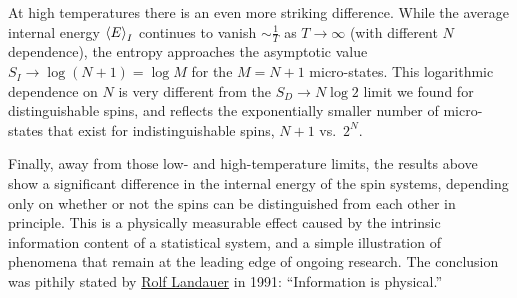 At high temperatures there is an even more striking difference.
While the average internal energy $\left\langle E \right\rangle_I$ continues to vanish $\sim$$\frac{1}{T}$ as $T \to \infty$ (with different $N$ dependence), the entropy approaches the asymptotic value $S_I \to \log\left(N + 1\right) = \log M$ for the $M = N + 1$ micro-states.
This logarithmic dependence on $N$ is very different from the $S_D \to N\log 2$ limit we found for distinguishable spins, and reflects the exponentially smaller number of micro-states that exist for indistinguishable spins, $N + 1$ vs.\ $2^N$.

Finally, away from those low- and high-temperature limits, the results above show a significant difference in the internal energy of the spin systems, depending only on whether or not the spins can be distinguished from each other in principle.
This is a physically measurable effect caused by the intrinsic information content of a statistical system, and a simple illustration of phenomena that remain at the leading edge of ongoing research.
The conclusion was pithily stated by \href{https://en.wikipedia.org/wiki/Rolf_Landauer}{Rolf Landauer} in 1991: ``Information is physical.''
